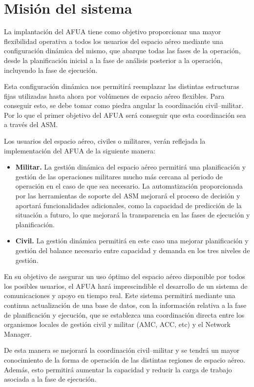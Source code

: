 \section{Misión del sistema}

La implantación del AFUA tiene como objetivo proporcionar una mayor flexibilidad operativa a todos los usuarios del espacio aéreo mediante una configuración dinámica del mismo, que abarque todas las fases de la operación, desde la planificación inicial a la fase de análisis posterior a la operación, incluyendo la fase de ejecución.

Esta configuración dinámica nos permitirá reemplazar las distintas estructuras fijas utilizadas hasta ahora por volúmenes de espacio aéreo flexibles. Para conseguir esto, se debe tomar como piedra angular la coordinación civil–militar. Por lo que el primer objetivo del AFUA será conseguir que esta coordinación sea a través del ASM.

Los usuarios del espacio aéreo, civiles o militares, verán reflejada la implementación del AFUA de la siguiente manera:

\begin{itemize}
    \item \textbf{Militar.} La gestión dinámica del espacio aéreo permitirá una planificación y gestión de las operaciones militares mucho más cercana al periodo de operación en el caso de que sea necesario. La automatización proporcionada por las herramientas de soporte del ASM mejorará el proceso de decisión y aportará funcionalidades adicionales, como la capacidad de predicción de la situación a futuro, lo que mejorará la transparencia en las fases de ejecución y planificación.
    \item \textbf{Civil.} La gestión dinámica permitirá en este caso una mejorar planificación y gestión del balance necesario entre capacidad y demanda en los tres niveles de gestión.
\end{itemize}

En su objetivo de asegurar un uso óptimo del espacio aéreo disponible por todos los posibles usuarios, el AFUA hará imprescindible el desarrollo de un sistema de comunicaciones y apoyo en tiempo real. Este sistema permitirá mediante una continua actualización de una base de datos, con la información relativa a la fase de planificación y ejecución, que se establezca una coordinación directa entre los organismos locales de gestión civil y militar (AMC, ACC, etc) y el Network Manager.

De esta manera se mejorará la coordinación civil–militar y se tendrá un mayor conocimiento de la forma de operación de las distintas regiones de espacio aéreo. Además, esto permitirá aumentar la capacidad y reducir la carga de trabajo asociada a la fase de ejecución.

